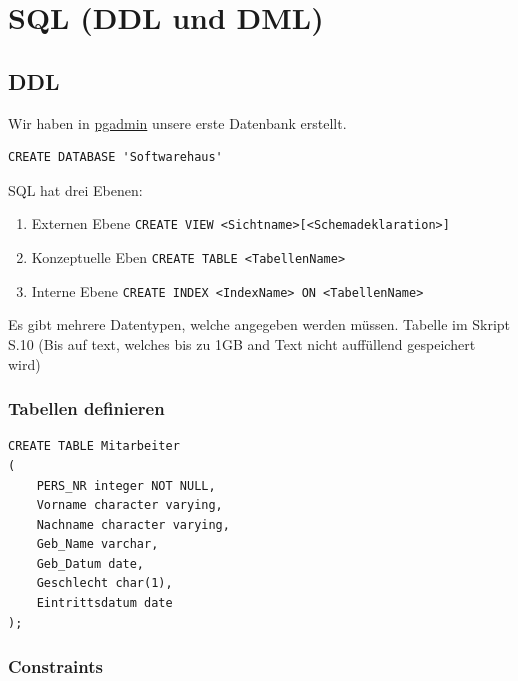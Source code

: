 \documentclass[a4paper]{article}
\title{\docTitle}
\author{Moritz}
\date{\today}
\begin{document}
\maketitle
\tableofcontents


\section{SQL (DDL und DML)}

\subsection{DDL}

Wir haben in \href{www.postgres.org}{pgadmin} unsere erste Datenbank erstellt.

\begin{lstlisting}
CREATE DATABASE 'Softwarehaus'
\end{lstlisting}

SQL hat drei Ebenen:

\begin{enumerate}
    \item Externen Ebene \lstinline|CREATE VIEW <Sichtname>[<Schemadeklaration>]|
    \item Konzeptuelle Eben \lstinline|CREATE TABLE <TabellenName>|
    \item Interne Ebene \lstinline|CREATE INDEX <IndexName> ON <TabellenName>|
\end{enumerate}

Es gibt mehrere Datentypen, welche angegeben werden müssen. Tabelle im Skript S.10 (Bis auf text, welches bis zu 1GB and Text nicht auffüllend gespeichert wird)

\subsubsection{Tabellen definieren}

\begin{lstlisting}
CREATE TABLE Mitarbeiter
(
    PERS_NR integer NOT NULL,
    Vorname character varying,
    Nachname character varying,
    Geb_Name varchar,
    Geb_Datum date,
    Geschlecht char(1),
    Eintrittsdatum date
);
\end{lstlisting}

\subsubsection{Constraints}
\end{document}
